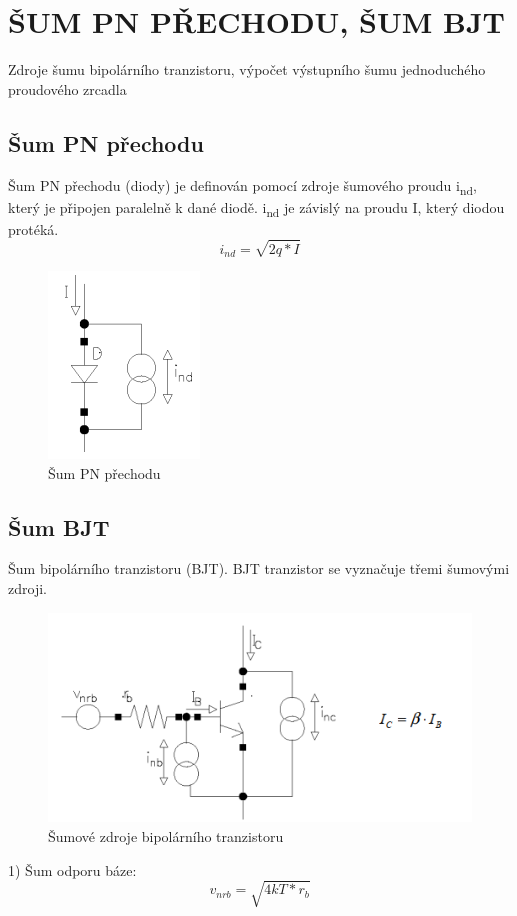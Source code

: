 \section{ŠUM PN PŘECHODU, ŠUM BJT}
Zdroje šumu bipolárního tranzistoru, výpočet výstupního šumu jednoduchého proudového zrcadla

\subsection{Šum PN přechodu}
Šum PN přechodu (diody) je definován pomocí zdroje šumového proudu i\textsubscript{nd}, který je připojen paralelně k dané diodě. i\textsubscript{nd} je závislý na proudu I, který diodou protéká.
\begin{equation}
i_{nd}=\sqrt{2q*I}
\end{equation}

\begin{figure}[h]
   \begin{center}
     \includegraphics[scale=0.5]{images/sumPN.png}
   \end{center}
   \caption{Šum PN přechodu}
\end{figure}

\subsection{Šum BJT}
Šum bipolárního tranzistoru (BJT). BJT tranzistor se vyznačuje třemi šumovými zdroji.
\begin{figure}[h]
   \begin{center}
     \includegraphics[scale=0.5]{images/sumBJT.png}
   \end{center}
   \caption{Šumové zdroje bipolárního tranzistoru}
\end{figure}
1) Šum odporu báze:
\begin{equation}
v_{nrb}=\sqrt{4kT*r_{b}}
\end{equation}

